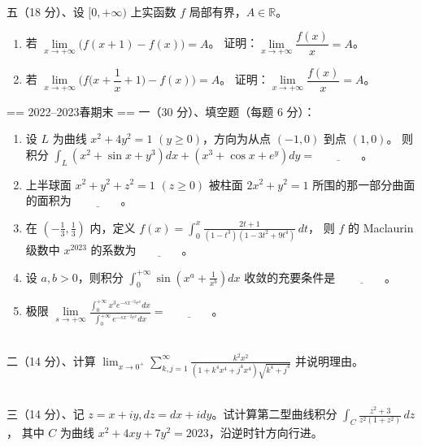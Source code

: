 ~\\
五（18 分）、设 $[0,+\infty)$ 上实函数 $f$ 局部有界，$A \in \mathbb{R}$。
\begin{enumerate}[label=(\arabic*)]
\item 若 $\lim\limits_{x \rightarrow+\infty}\big(f(x+1)-f(x)\big)=A$。
证明：$\lim\limits_{x \rightarrow+\infty} \dfrac{f(x)}{x}=A$。
\item 若 $\lim\limits_{x \rightarrow+\infty}\Big(f\big(x+\dfrac{1}{x}+1\big)-f(x)\Big)=A$。
证明：$\lim\limits_{x \rightarrow+\infty} \dfrac{f(x)}{x}=A$。
\end{enumerate}

== 2022--2023春期末 ==
一（30 分）、填空题（每题 6 分）：
\begin{enumerate}[label=(\arabic*)]
\item 设 $L$ 为曲线 $x^{2}+4 y^{2}=1$ $(y \geq 0)$，方向为从点 $(-1,0)$ 到点 $(1,0)$。
则积分 $\displaystyle\int_{L}\left(x^{2}+\sin x+y^{3}\right) d x+\left(x^{3}+\cos x+e^{y}\right) dy=\underline{\qquad\qquad}$。
\item 上半球面 $x^{2}+y^{2}+z^{2}=1$ $(z \geq 0)$ 被柱面 $2 x^{2}+y^{2}=1$ 所围的那一部分曲面的面积为 $\underline{\qquad\qquad}$。
\item 在 $\left(-\frac{1}{3},\frac{1}{3}\right)$ 内，定义 $\displaystyle f(x)=\int_{0}^{x} \frac{2t+1}{(1-t^{3})(1-3t^{2}+9t^{4})} \, dt$，
则 $f$ 的 Maclaurin 级数中 $x^{2023}$ 的系数为$\underline{\qquad\qquad}$。
\item 设 $a,b>0$，则积分 $\displaystyle\int_{0}^{+\infty} \sin \left(x^{a}+\frac{1}{x^{b}}\right) dx$ 收敛的充要条件是 $\underline{\qquad\qquad}$。
\item 极限 $\lim\limits_{s \rightarrow+\infty} \frac{\displaystyle\int_{0}^{+\infty} x^{3} e^{-sx^{-2}e^{x}} dx}{\displaystyle\int_{0}^{+\infty} e^{-sx^{-2}e^{x}} dx}=\underline{\qquad\qquad}$。
\end{enumerate}
~\\
二（14 分）、计算 $\displaystyle\lim_{x \rightarrow 0^{+}} \sum_{k,j=1}^{\infty} \frac{k^{2}x^{2}}{(1+k^{4}x^{4}+j^{4}x^{4}) \sqrt{k^{4}+j^{4}}}$ 并说明理由。

~\\
三（14 分）、记 $z=x+iy, dz=dx+idy$。试计算第二型曲线积分 $\displaystyle\int_{C} \frac{z^{2}+3}{z^{2}(1+z^{2})} \, dz$，
其中 $C$ 为曲线 $x^{2}+4xy+7y^{2}=2023$，沿逆时针方向行进。

